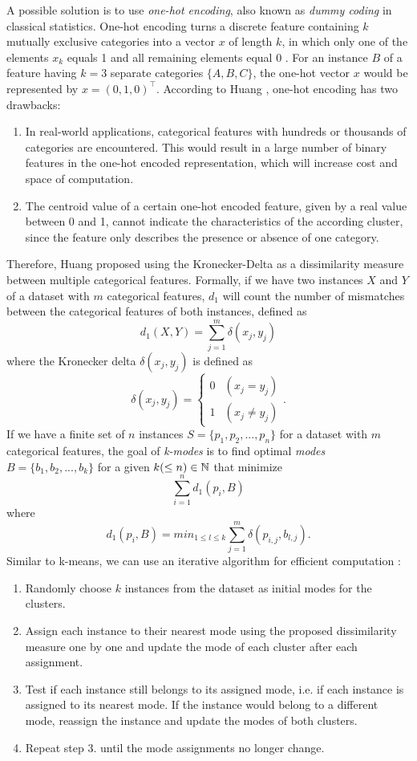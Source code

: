 A possible solution is to use \textit{one-hot encoding}, also known as \textit{dummy coding} in classical statistics. One-hot encoding turns a discrete feature containing $k$ mutually exclusive categories into a vector $x$ of length $k$, in which only one of the elements $x_k$ equals 1 and all remaining elements equal 0 \cite{pattern_recognition_machine_learning}. For an instance $B$ of a feature having $k=3$ separate categories $\{A, B, C\}$, the one-hot vector $x$ would be represented by $x = (0, 1, 0)^{\intercal}$. According to Huang \cite{kmodes}, one-hot encoding has two drawbacks:
\begin{enumerate} 
	\item In real-world applications, categorical features with hundreds or thousands of categories are encountered. This would result in a large number of binary features in the one-hot encoded representation, which will increase cost and space of computation.
	\item The centroid value of a certain one-hot encoded feature, given by a real value between 0 and 1, cannot indicate the characteristics of the according cluster, since the feature only describes the presence or absence of one category.
\end{enumerate}
Therefore, Huang \cite{kmodes} proposed using the Kronecker-Delta as a dissimilarity measure between multiple categorical features. Formally, if we have two instances $X$ and $Y$ of a dataset with $m$ categorical features, $d_1$ will count the number of mismatches between the categorical features of both instances, defined as
$$d_1(X, Y) = \sum^m_{j=1} \delta (x_j, y_j)$$
where the Kronecker delta $\delta (x_j, y_j)$ is defined as
$$\delta (x_j, y_j) = 
\begin{cases}
    0 & (x_j = y_j)\\
    1 & (x_j \neq y_j)
\end{cases}.
$$
If we have a finite set of $n$ instances $S=\{p_1, p_2, ..., p_n\}$ for a dataset with $m$ categorical features, the goal of \textit{k-modes} \cite{kmodes} is to find optimal \textit{modes} $B=\{b_1, b_2, ..., b_k\}$ for a given $k (\leq n) \in \mathbb{N}$ that minimize
$$\sum_{i=1}^n  d_1(p_i, B)$$
where
$$d_1(p_i, B) = min_{1 \leq l \leq k} \sum^m_{j=1} \delta (p_{i,j}, b_{l,j}).$$
Similar to k-means, we can use an iterative algorithm for efficient computation \cite{kmodes}:
\begin{enumerate} 
	\item Randomly choose $k$ instances from the dataset as initial modes for the clusters.
	\item Assign each instance to their nearest mode using the proposed dissimilarity measure one by one and update the mode of each cluster after each assignment.
	\item Test if each instance still belongs to its assigned mode, i.e. if each instance is assigned to its nearest mode. If the instance would belong to a different mode, reassign the instance and update the modes of both clusters.
	\item Repeat step 3. until the mode assignments no longer change.
\end{enumerate}

